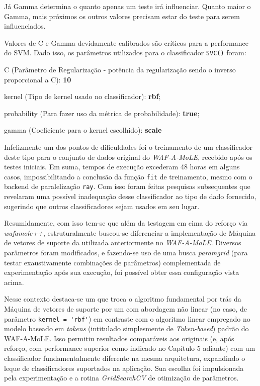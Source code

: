 Já Gamma determina o quanto apenas um teste irá influenciar. Quanto maior o Gamma, mais próximos os outros valores precisam estar do teste para serem influenciados.

Valores de C e Gamma devidamente calibrados são críticos para a performance do SVM. Dado isso, os parâmetros utilizados para o classificador \verb+SVC()+ foram:
\begin{alineas}
    \item C (Parâmetro de Regularização - potência da regularização sendo o inverso proporcional a C): \textbf{10} 
    \item kernel (Tipo de kernel usado no classificador): \textbf{rbf};
    \item probability (Para fazer uso da métrica de probabilidade): \textbf{true};
    \item gamma (Coeficiente para o kernel escolhido): \textbf{scale}
\end{alineas}

\bigskip

Infelizmente um dos pontos de dificuldades foi o treinamento de um classificador deste tipo para o conjunto de dados original do \textit{WAF-A-MoLE}, recebido após os testes iniciais. Em suma, tempos de execução excederam 48 horas em alguns casos, impossibilitando a conclusão da função \verb+fit+ de treinamento, mesmo com o backend de paralelização \verb+ray+.  Com isso foram feitas pesquisas subsequentes que revelaram uma possível inadequação desse classificador ao tipo de dado fornecido, sugerindo que outros classificadores sejam usados em seu lugar.

Resumidamente, com isso tem-se que além da testagem em cima do reforço via \textit{wafamole++}, estruturalmente buscou-se diferenciar a implementação de Máquina de vetores de suporte da utilizada anteriormente no \textit{WAF-A-MoLE}. Diversos parâmetros foram modificados, e fazendo-se uso de uma busca \textit{paramgrid} (para testar exaustivamente combinações de parâmetros) complementada de experimentação após sua execução, foi possível obter essa configuração vista acima. 

Nesse contexto destaca-se um que troca o algoritmo fundamental por trás da Máquina de vetores de suporte por um com abordagem não linear (no caso, de parâmetro \verb+kernel = 'rbf'+) em contraste com o algoritmo linear empregado no modelo baseado em \textit{tokens} (intitulado simplesmente de \textit{Token-based}) padrão do WAF-A-MoLE. Isso permitiu resultados comparáveis aos originais (e, após reforço, com performance superior como indicado no Capítulo 5 adiante) com um classificador fundamentalmente diferente na mesma arquitetura, expandindo o leque de classificadores suportados na aplicação. Sua escolha foi impulsionada pela experimentação e a rotina \textit{GridSearchCV} de otimização de parâmetros.

